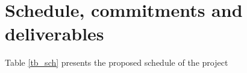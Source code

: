 \documentclass[12pt,letterpaper]{article}
\begin{document}
\section{Schedule, commitments and deliverables}

Table \ref{tb_sch} presents the proposed schedule of the project

\end{document}
